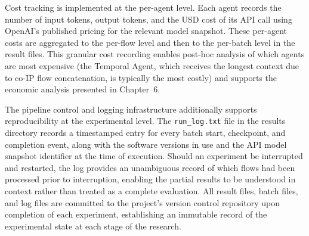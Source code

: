 Cost tracking is implemented at the per-agent level. Each agent records the number of input tokens, output tokens, and the USD cost of its API call using OpenAI's published pricing for the relevant model snapshot. These per-agent costs are aggregated to the per-flow level and then to the per-batch level in the result files. This granular cost recording enables post-hoc analysis of which agents are most expensive (the Temporal Agent, which receives the longest context due to co-IP flow concatenation, is typically the most costly) and supports the economic analysis presented in Chapter~6.

The pipeline control and logging infrastructure additionally supports reproducibility at the experimental level. The \texttt{run\_log.txt} file in the results directory records a timestamped entry for every batch start, checkpoint, and completion event, along with the software versions in use and the API model snapshot identifier at the time of execution. Should an experiment be interrupted and restarted, the log provides an unambiguous record of which flows had been processed prior to interruption, enabling the partial results to be understood in context rather than treated as a complete evaluation. All result files, batch files, and log files are committed to the project's version control repository upon completion of each experiment, establishing an immutable record of the experimental state at each stage of the research.

